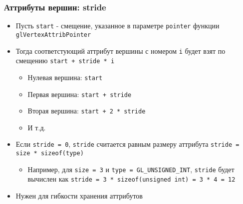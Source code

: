 \documentclass{beamer}
\begin{document}
\begin{frame}[fragile]
\frametitle{Аттрибуты вершин: stride}
\begin{itemize}
\item Пусть \verb|start| - смещение, указанное в параметре \verb|pointer| функции \verb|glVertexAttribPointer|
\item Тогда соответстующий аттрибут вершины с номером \verb|i| будет взят по смещению \verb|start + stride * i|
\pause
\begin{itemize}
\item Нулевая вершина: \verb|start|
\item Первая вершина: \verb|start + stride|
\item Вторая вершина: \verb|start + 2 * stride|
\item И т.д.
\end{itemize}
\pause
\item Если \verb|stride = 0|, \verb|stride| считается равным размеру аттрибута \verb|stride = size * sizeof(type)|
\begin{itemize}
\item Например, для \verb|size = 3| и \verb|type = GL_UNSIGNED_INT|, \verb|stride| будет вычислен как \verb|stride = 3 * sizeof(unsigned int) = 3 * 4 = 12|
\end{itemize}
\pause
\item Нужен для гибкости хранения аттрибутов
\end{itemize}
\end{frame}
\end{document}
